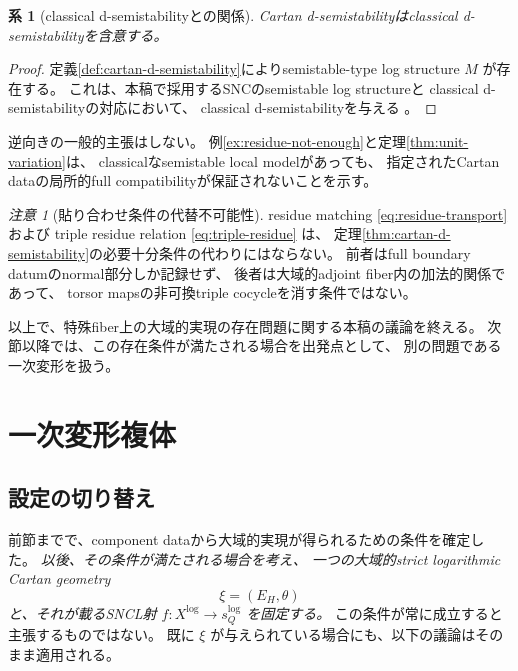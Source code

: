 \documentclass[uplatex,dvipdfmx,11pt]{jsarticle}
\numberwithin{equation}{section}
\theoremstyle{plain}
\newtheorem{corollary}[theorem]{系}
\theoremstyle{definition}
\theoremstyle{remark}
\newtheorem{remark}[theorem]{注意}
\newcommand{\sQ}{s_Q^{\log}}
\newcommand{\Xlog}{X^{\log}}
\begin{document}
\begin{corollary}[classical d-semistabilityとの関係]
\label{cor:classical-d-semistability}
Cartan d-semistabilityはclassical d-semistabilityを含意する。
\end{corollary}

\begin{proof}
定義\ref{def:cartan-d-semistability}によりsemistable-type log structure \(M\) が存在する。
これは、本稿で採用するSNCのsemistable log structureと
classical d-semistabilityの対応において、
classical d-semistabilityを与える
\cite{Kato89,PB,CPV}。
\end{proof}

逆向きの一般的主張はしない。
例\ref{ex:residue-not-enough}と定理\ref{thm:unit-variation}は、
classicalなsemistable local modelがあっても、
指定されたCartan dataの局所的full compatibilityが保証されないことを示す。

\begin{remark}[貼り合わせ条件の代替不可能性]
\label{rem:residue-not-substitute}
residue matching \eqref{eq:residue-transport} および
triple residue relation \eqref{eq:triple-residue} は、
定理\ref{thm:cartan-d-semistability}の必要十分条件の代わりにはならない。
前者はfull boundary datumのnormal部分しか記録せず、
後者は大域的adjoint fiber内の加法的関係であって、
torsor mapsの非可換triple cocycleを消す条件ではない。
\end{remark}

\medskip
\noindent
以上で、特殊fiber上の大域的実現の存在問題に関する本稿の議論を終える。
次節以降では、この存在条件が満たされる場合を出発点として、
別の問題である一次変形を扱う。

\section{一次変形複体}
\label{sec:first-order-complexes}

\subsection{設定の切り替え}

前節までで、component dataから大域的実現が得られるための条件を確定した。
\emph{以後、その条件が満たされる場合を考え、
一つの大域的strict logarithmic Cartan geometry
\[
\xi=(E_H,\theta)
\]
と、それが載るSNCL射 \(f:\Xlog\to\sQ\) を固定する。}
この条件が常に成立すると主張するものではない。
既に \(\xi\) が与えられている場合にも、以下の議論はそのまま適用される。
\end{document}
